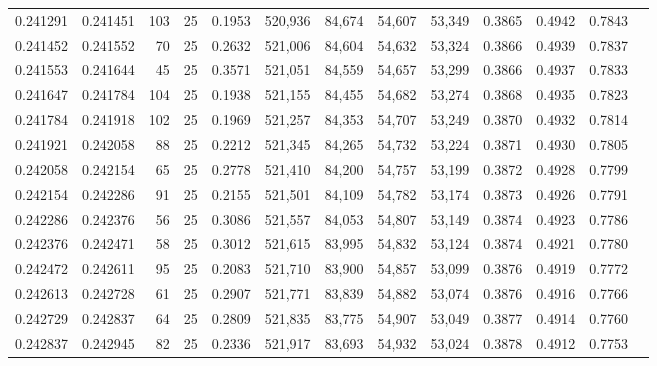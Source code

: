 \begin{tabular}{rrrrrrrrrrrrr}
0.241291 & 0.241451 &   103 &  25 &                                     0.1953 & 520,936 &  84,674 &  54,607 &  53,349 & 0.3865 & 0.4942 & 0.7843 \\
0.241452 & 0.241552 &    70 &  25 &                                     0.2632 & 521,006 &  84,604 &  54,632 &  53,324 & 0.3866 & 0.4939 & 0.7837 \\
0.241553 & 0.241644 &    45 &  25 &                                     0.3571 & 521,051 &  84,559 &  54,657 &  53,299 & 0.3866 & 0.4937 & 0.7833 \\
0.241647 & 0.241784 &   104 &  25 &                                     0.1938 & 521,155 &  84,455 &  54,682 &  53,274 & 0.3868 & 0.4935 & 0.7823 \\
0.241784 & 0.241918 &   102 &  25 &                                     0.1969 & 521,257 &  84,353 &  54,707 &  53,249 & 0.3870 & 0.4932 & 0.7814 \\
0.241921 & 0.242058 &    88 &  25 &                                     0.2212 & 521,345 &  84,265 &  54,732 &  53,224 & 0.3871 & 0.4930 & 0.7805 \\
0.242058 & 0.242154 &    65 &  25 &                                     0.2778 & 521,410 &  84,200 &  54,757 &  53,199 & 0.3872 & 0.4928 & 0.7799 \\
0.242154 & 0.242286 &    91 &  25 &                                     0.2155 & 521,501 &  84,109 &  54,782 &  53,174 & 0.3873 & 0.4926 & 0.7791 \\
0.242286 & 0.242376 &    56 &  25 &                                     0.3086 & 521,557 &  84,053 &  54,807 &  53,149 & 0.3874 & 0.4923 & 0.7786 \\
0.242376 & 0.242471 &    58 &  25 &                                     0.3012 & 521,615 &  83,995 &  54,832 &  53,124 & 0.3874 & 0.4921 & 0.7780 \\
0.242472 & 0.242611 &    95 &  25 &                                     0.2083 & 521,710 &  83,900 &  54,857 &  53,099 & 0.3876 & 0.4919 & 0.7772 \\
0.242613 & 0.242728 &    61 &  25 &                                     0.2907 & 521,771 &  83,839 &  54,882 &  53,074 & 0.3876 & 0.4916 & 0.7766 \\
0.242729 & 0.242837 &    64 &  25 &                                     0.2809 & 521,835 &  83,775 &  54,907 &  53,049 & 0.3877 & 0.4914 & 0.7760 \\
0.242837 & 0.242945 &    82 &  25 &                                     0.2336 & 521,917 &  83,693 &  54,932 &  53,024 & 0.3878 & 0.4912 & 0.7753 \\

\end{tabular}
